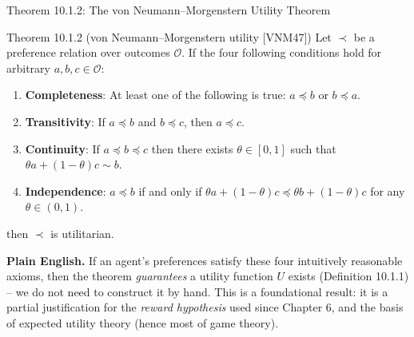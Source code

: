\documentclass[aspectratio=169,10pt]{beamer}
\newcommand{\Oc}{\mathcal{O}}
\begin{document}
\begin{frame}{Theorem 10.1.2: The von Neumann--Morgenstern Utility Theorem}
  \begin{block}{Theorem 10.1.2 (von Neumann--Morgenstern utility {\footnotesize[VNM47]})}
    Let $\prec$ be a preference relation over outcomes $\Oc$. If the four
    following conditions hold for arbitrary $a,b,c\in\Oc$:
    \begin{enumerate}
      \item \textbf{Completeness}: At least one of the following is true:
        $a\preceq b$ or $b\preceq a$.
      \item \textbf{Transitivity}: If $a\preceq b$ and $b\preceq c$, then
        $a\preceq c$.
      \item \textbf{Continuity}: If $a\preceq b\preceq c$ then there
        exists $\theta\in[0,1]$ such that $\theta a+(1-\theta)c\sim b$.
      \item \textbf{Independence}: $a\preceq b$ if and only if
        $\theta a+(1-\theta)c \preceq \theta b+(1-\theta)c$ for any
        $\theta\in(0,1)$.
    \end{enumerate}
    then $\prec$ is utilitarian.
  \end{block}
  \textbf{Plain English.} If an agent's preferences satisfy these four
  intuitively reasonable axioms, then the theorem \emph{guarantees} a
  utility function $U$ exists (Definition 10.1.1) -- we do not need to
  construct it by hand. This is a foundational result: it is a partial
  justification for the \emph{reward hypothesis} used since Chapter 6, and
  the basis of expected utility theory (hence most of game theory).
\end{frame}
\end{document}
